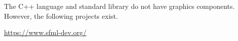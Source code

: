 The C++ language and standard library do not have graphics components.
However, the following projects exist.

\url{https://www.sfml-dev.org/}
